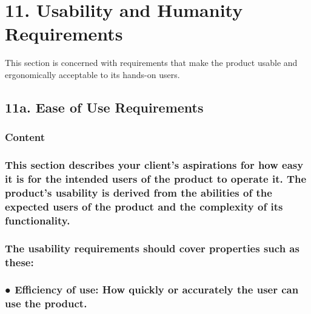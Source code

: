 \documentclass[
]{article}
\begin{document}
\hypertarget{usability-and-humanity-requirements}{%
\section{11. Usability and Humanity
Requirements}\label{usability-and-humanity-requirements}}

This section is concerned with requirements that make the product usable
and ergonomically acceptable to its hands-on users.

\hypertarget{a.-ease-of-use-requirements}{%
\subsection{\texorpdfstring{11a. Ease of Use Requirements
}{11a. Ease of Use Requirements }}\label{a.-ease-of-use-requirements}}

\hypertarget{content-32}{%
\subsubsection{Content}\label{content-32}}

\hypertarget{this-section-describes-your-clients-aspirations-for-how-easy-it-is-for-the-intended-users-of-the-product-to-operate-it.-the-products-usability-is-derived-from-the-abilities-of-the-expected-users-of-the-product-and-the-complexity-of-its-functionality.}{%
\subsubsection{This section describes your client's aspirations for how
easy it is for the intended users of the product to operate it. The
product's usability is derived from the abilities of the expected users
of the product and the complexity of its
functionality.}\label{this-section-describes-your-clients-aspirations-for-how-easy-it-is-for-the-intended-users-of-the-product-to-operate-it.-the-products-usability-is-derived-from-the-abilities-of-the-expected-users-of-the-product-and-the-complexity-of-its-functionality.}}

\hypertarget{the-usability-requirements-should-cover-properties-such-as-these}{%
\subsubsection{The usability requirements should cover properties such
as
these:}\label{the-usability-requirements-should-cover-properties-such-as-these}}

\hypertarget{efficiency-of-use-how-quickly-or-accurately-the-user-can-use-the-product.}{%
\subsubsection{● Efficiency of use: How quickly or accurately the user
can use the
product.}\label{efficiency-of-use-how-quickly-or-accurately-the-user-can-use-the-product.}}
\end{document}
